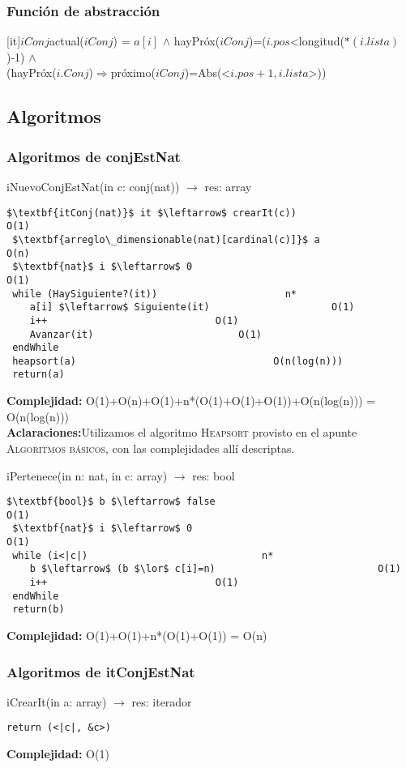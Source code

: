   \subsubsection{Funci\'on de abstracci\'on}
	
	[it]{$iConj$}{actual($iConj$) = $a[i]$ $\land$ hayPr\'ox($iConj$)=($i.pos$<longitud($*(i.lista)$)-1) $\land$ \\(hayPr\'ox($i.Conj$)$\Rightarrow$pr\'oximo($iConj$)=Abs(<$i.pos+1, i.lista$>))}
	
\subsection{Algoritmos}
\subsubsection{Algoritmos de conjEstNat}
iNuevoConjEstNat(in c: conj(nat)) $\rightarrow$ res: array
\begin{lstlisting}[mathescape]
 $\textbf{itConj(nat)}$ it $\leftarrow$ crearIt(c))								O(1)
 $\textbf{arreglo\_dimensionable(nat)[cardinal(c)]}$ a										O(n)
 $\textbf{nat}$ i $\leftarrow$ 0										O(1)
 while (HaySiguiente?(it))						n*
 	a[i] $\leftarrow$ Siguiente(it)						O(1)
 	i++								O(1)
 	Avanzar(it)							O(1)
 endWhile
 heapsort(a)						  		  O(n(log(n)))
 return(a)
\end{lstlisting}
\textbf{Complejidad:} O(1)+O(n)+O(1)+n*(O(1)+O(1)+O(1))+O(n(log(n))) = O(n(log(n)))\\
\textbf{Aclaraciones:}Utilizamos el algoritmo \textsc{Heapsort} provisto en el apunte \textsc{Algoritmos b\'asicos}, con las complejidades all\'i descriptas.


iPertenece(in n: nat, in c: array) $\rightarrow$ res: bool
\begin{lstlisting}[mathescape]
 $\textbf{bool}$ b $\leftarrow$ false									O(1)
 $\textbf{nat}$ i $\leftarrow$ 0										O(1)
 while (i<|c|)								n*
 	b $\leftarrow$ (b $\lor$ c[i]=n)							O(1)
 	i++								O(1)
 endWhile
 return(b)
\end{lstlisting}
\textbf{Complejidad:} O(1)+O(1)+n*(O(1)+O(1)) = O(n)\\

\subsubsection{Algoritmos de itConjEstNat}
iCrearIt(in a: array) $\rightarrow$ res: iterador
\begin{lstlisting}[mathescape]
 return (<|c|, &c>)
\end{lstlisting}
\textbf{Complejidad:} O(1)\\

